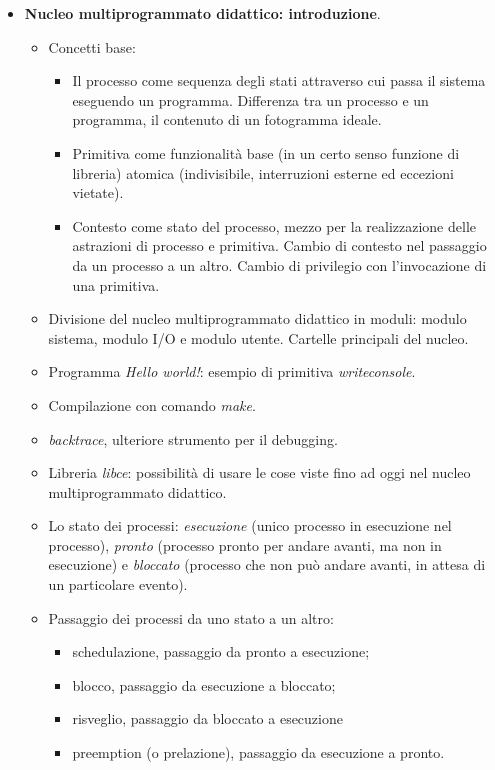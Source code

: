 \documentclass[11pt]{report}
\theoremstyle{definition}
\begin{document}
\begin{itemize}
\begin{itemize}
\begin{itemize}
		\end{itemize}
	\end{itemize}
\clearpage 
	\item \textbf{Nucleo multiprogrammato didattico: introduzione}.
	\begin{itemize}
		\item Concetti base:
		\begin{itemize}
		\item Il processo come sequenza degli stati attraverso cui passa il sistema eseguendo un programma. Differenza tra un processo e un programma, il contenuto di un fotogramma ideale.
		\item Primitiva come funzionalità base (in un certo senso funzione di libreria) atomica (indivisibile, interruzioni esterne ed eccezioni vietate).
		\item Contesto come stato del processo, mezzo per la realizzazione delle astrazioni di processo e primitiva. Cambio di contesto nel passaggio da un processo a un altro. Cambio di privilegio con l'invocazione di una primitiva.
		\end{itemize}
		\item Divisione del nucleo multiprogrammato didattico in moduli: modulo sistema, modulo I/O e modulo utente. Cartelle principali del nucleo.
		\item Programma \emph{Hello world!}: esempio di primitiva \emph{writeconsole}.
		\item Compilazione con comando \emph{make}.
		\item \emph{backtrace}, ulteriore strumento per il debugging.
		\item Libreria \emph{libce}: possibilità di usare le cose viste fino ad oggi nel nucleo multiprogrammato didattico.
		\item Lo stato dei processi: \emph{esecuzione} (unico processo in esecuzione nel processo), \emph{pronto} (processo pronto per andare avanti, ma non in esecuzione) e \emph{bloccato} (processo che non può andare avanti, in attesa di un particolare evento).
		\item Passaggio dei processi da uno stato a un altro:
		\begin{itemize}
			\item schedulazione, passaggio da pronto a esecuzione;
			\item blocco, passaggio da esecuzione a bloccato;
			\item risveglio, passaggio da bloccato a esecuzione
			\item preemption (o prelazione), passaggio da esecuzione a pronto.

\end{itemize}
\end{itemize}
\end{itemize}
\end{document}
